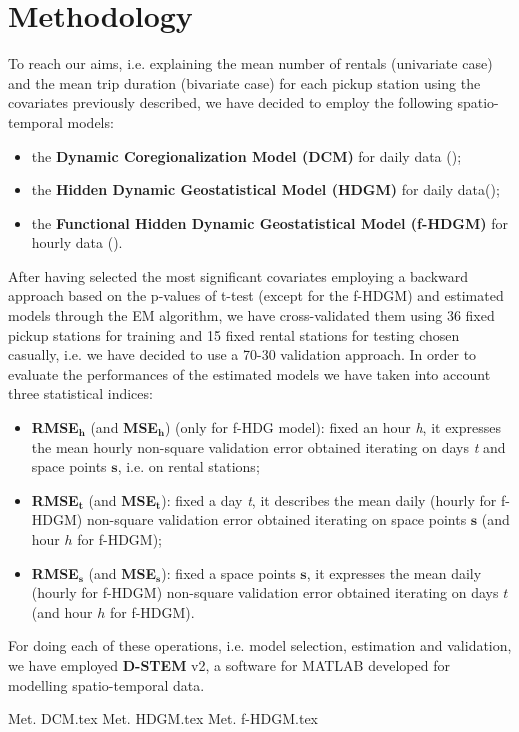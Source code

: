 \section{Methodology}
To reach our aims, i.e. explaining the mean number of rentals (univariate case) and the mean trip duration (bivariate case) for each pickup station using the covariates previously described, we have decided to employ the following spatio-temporal models:
\begin{itemize}
	\item the \textbf{Dynamic Coregionalization Model (DCM)} for daily data (\cite{dcm});
	\item the \textbf{Hidden Dynamic Geostatistical Model (HDGM)} for daily data(\cite{hdgm});
	\item the \textbf{Functional Hidden Dynamic Geostatistical Model (f-HDGM)} for hourly data (\cite{dstem}).
\end{itemize}
After having selected the most significant covariates employing a backward approach based on the p-values of t-test (except for the f-HDGM) and estimated models through the EM algorithm, we have cross-validated them using \num{36} fixed pickup stations for training and \num{15} fixed rental stations for testing chosen casually, i.e. we have decided to use a \num{70}-\num{30} validation approach. In order to evaluate the performances of the estimated models we have taken into account three statistical indices:
\begin{itemize}
	\item \textbf{RMSE}$\boldsymbol{_h}$ (and \textbf{MSE}$\boldsymbol{_h}$) (only for f-HDG model): fixed an hour \textit{h}, it expresses the mean hourly non-square validation error obtained iterating on days \textit{t} and space points $\boldsymbol{s}$, i.e. on rental stations;  
	\item \textbf{RMSE}$\boldsymbol{_t}$ (and \textbf{MSE}$\boldsymbol{_t}$): fixed a day \textit{t}, it describes the mean daily (hourly for f-HDGM) non-square validation error obtained iterating on space points $\boldsymbol{s}$ (and hour $h$ for f-HDGM);
	\item \textbf{RMSE}$\boldsymbol{_s}$ (and \textbf{MSE}$\boldsymbol{_s}$): fixed a space points $\boldsymbol{s}$, it expresses the mean daily (hourly for f-HDGM) non-square validation error obtained iterating on days $t$ (and hour $h$ for \mbox{f-HDGM}).
\end{itemize}For doing each of these operations, i.e. model selection, estimation and validation, we have employed \textbf{D-STEM} v\num{2}, a software for MATLAB developed for modelling spatio-temporal data.

{Met. DCM.tex}
{Met. HDGM.tex}
{Met. f-HDGM.tex}
